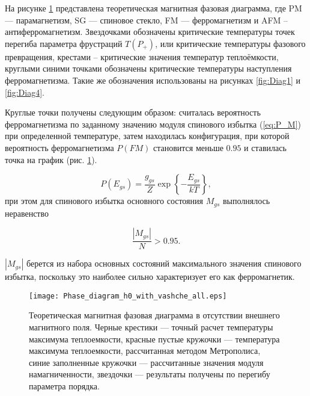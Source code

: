 На рисунке \ref{fig:Diag} представлена теоретическая магнитная фазовая диаграмма, где PM --- парамагнетизм, SG --- спиновое стекло, FM --- ферромагнетизм и AFM -- антиферромагнетизм. Звездочками обозначены критические температуры точек перегиба параметра фрустраций $T(P_{+})$, или критические температуры фазового превращения, крестами -- критические значения температур теплоёмкости, круглыми синими точками обозначены критические температуры наступления ферромагнетизма. Такие же обозначения использованы на рисунках \ref{fig:Diag1} и \ref{fig:Diag4}.

Круглые точки получены следующим образом: считалась вероятность ферромагнетизма по заданному значению модуля спинового избытка (\ref{eq:P_M}) при определенной температуре, затем находилась конфигурация, при которой вероятность ферромагнетизма $P(FM)$ становится меньше $0.95$ и ставилась точка на график (рис. \ref{fig:Diag}).

\begin{equation}
	P(E_{gs}) =\frac{g_{gs}}{Z} \exp\left\{-\frac{E_{gs}}{kT}\right\},
	\label{eq:P_M}
\end{equation}
при этом для спинового избытка основного состояния $M_{gs}$ выполнялось неравенство

\begin{equation}
	\frac{|M_{gs}|}{N} > 0.95.
	\label{eq:M/N}
\end{equation}

$|M_{gs}|$ берется из набора основных состояний максимального значения спинового избытка, поскольку это наиболее сильно характеризует его как ферромагнетик.


\begin{figure}[!ht]
	\centering
	\texttt{[image: Phase\_diagram\_h0\_with\_vashche\_all.eps]}
	\caption{Теоретическая магнитная фазовая диаграмма в отсутствии внешнего магнитного поля. Черные крестики --- точный расчет температуры максимума теплоемкости, красные пустые кружочки --- температура максимума теплоемкости, рассчитанная методом Метрополиса, синие заполненные кружочки ---  рассчитанные значения модуля намагниченности, звездочки --- результаты получены по перегибу параметра порядка.}
	\label{fig:Diag}
\end{figure}


